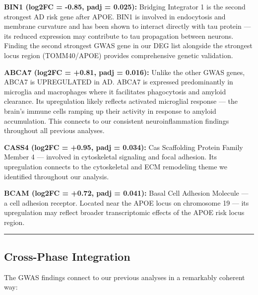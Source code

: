 \documentclass[
]{article}
\begin{document}
\textbf{BIN1 (log2FC = -0.85, padj = 0.025):} Bridging Integrator 1 is
the second strongest AD risk gene after APOE. BIN1 is involved in
endocytosis and membrane curvature and has been shown to interact
directly with tau protein --- its reduced expression may contribute to
tau propagation between neurons. Finding the second strongest GWAS gene
in our DEG list alongside the strongest locus region (TOMM40/APOE)
provides comprehensive genetic validation.

\textbf{ABCA7 (log2FC = +0.81, padj = 0.016):} Unlike the other GWAS
genes, ABCA7 is UPREGULATED in AD. ABCA7 is expressed predominantly in
microglia and macrophages where it facilitates phagocytosis and amyloid
clearance. Its upregulation likely reflects activated microglial
response --- the brain's immune cells ramping up their activity in
response to amyloid accumulation. This connects to our consistent
neuroinflammation findings throughout all previous analyses.

\textbf{CASS4 (log2FC = +0.95, padj = 0.034):} Cas Scaffolding Protein
Family Member 4 --- involved in cytoskeletal signaling and focal
adhesion. Its upregulation connects to the cytoskeletal and ECM
remodeling theme we identified throughout our analysis.

\textbf{BCAM (log2FC = +0.72, padj = 0.041):} Basal Cell Adhesion
Molecule --- a cell adhesion receptor. Located near the APOE locus on
chromosome 19 --- its upregulation may reflect broader transcriptomic
effects of the APOE risk locus region.

\begin{center}\rule{0.5\linewidth}{0.5pt}\end{center}

\subsection{Cross-Phase Integration}\label{cross-phase-integration}

The GWAS findings connect to our previous analyses in a remarkably
coherent way:
\end{document}
